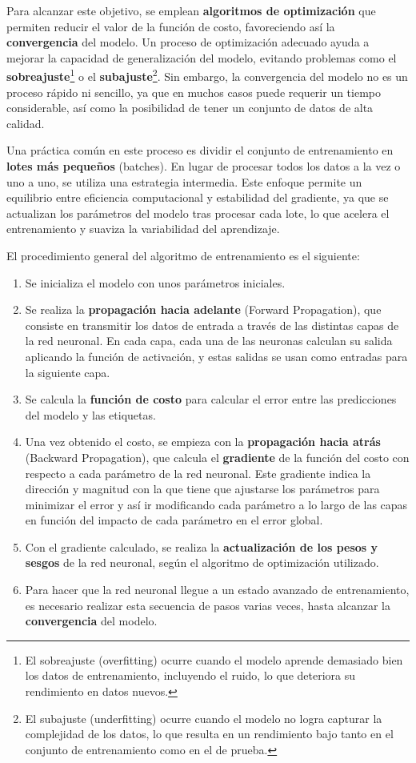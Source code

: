Para alcanzar este objetivo, se emplean \textbf{algoritmos de optimización} que permiten reducir el valor de la función de costo, favoreciendo así la \textbf{convergencia} del modelo. Un proceso de optimización adecuado ayuda a mejorar la capacidad de generalización del modelo, evitando problemas como el \textbf{sobreajuste}\footnote{El sobreajuste (overfitting) ocurre cuando el modelo aprende demasiado bien los datos de entrenamiento, incluyendo el ruido, lo que deteriora su rendimiento en datos nuevos.} o el \textbf{subajuste}\footnote{El subajuste (underfitting) ocurre cuando el modelo no logra capturar la complejidad de los datos, lo que resulta en un rendimiento bajo tanto en el conjunto de entrenamiento como en el de prueba.}. Sin embargo, la convergencia del modelo no es un proceso rápido ni sencillo, ya que en muchos casos puede requerir un tiempo considerable, así como la posibilidad de tener un conjunto de datos de alta calidad.

Una práctica común en este proceso es dividir el conjunto de entrenamiento en \textbf{lotes más pequeños} (batches). En lugar de procesar todos los datos a la vez o uno a uno, se utiliza una estrategia intermedia. Este enfoque permite un equilibrio entre eficiencia computacional y estabilidad del gradiente, ya que se actualizan los parámetros del modelo tras procesar cada lote, lo que acelera el entrenamiento y suaviza la variabilidad del aprendizaje.

El procedimiento general del algoritmo de entrenamiento es el siguiente:
\begin{enumerate}
    \item Se inicializa el modelo con unos parámetros iniciales.
    \item Se realiza la \textbf{propagación hacia adelante} (Forward Propagation), que consiste en transmitir los datos de entrada a través de las distintas capas de la red neuronal. En cada capa, cada una de las neuronas calculan su salida aplicando la función de activación, y estas salidas se usan como entradas para la siguiente capa.
    \item Se calcula la \textbf{función de costo} para calcular el error entre las predicciones del modelo y las etiquetas.
    \item Una vez obtenido el costo, se empieza con la \textbf{propagación hacia atrás} (Backward Propagation), que calcula el \textbf{gradiente} de la función del costo con respecto a cada parámetro de la red neuronal. Este gradiente indica la dirección y magnitud con la que tiene que ajustarse los parámetros para minimizar el error y así ir modificando cada parámetro a lo largo de las capas en función del impacto de cada parámetro en el error global.
    \item Con el gradiente calculado, se realiza la \textbf{actualización de los pesos y sesgos} de la red neuronal, según el algoritmo de optimización utilizado.
    \item Para hacer que la red neuronal llegue a un estado avanzado de entrenamiento, es necesario realizar esta secuencia de pasos varias veces, hasta alcanzar la \textbf{convergencia} del modelo.
\end{enumerate}

